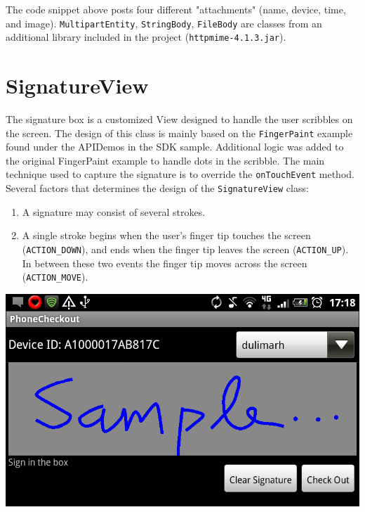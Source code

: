 \documentclass[11pt]{article} %
\begin{document}
The code snippet above posts four different "attachments" (name, device,
time, and image). \texttt{MultipartEntity}, \texttt{StringBody},
\texttt{FileBody} are classes from an additional library included
in the project (\texttt{httpmime-4.1.3.jar}).

\section{SignatureView}
The signature box is a customized View designed to handle the user scribbles 
on the screen. The design of this class is mainly based on the \texttt{FingerPaint}
example found under the APIDemos in the SDK sample. Additional logic was
added to the original FingerPaint example to handle dots in the scribble.
The main technique used to capture the signature is 
to override the \texttt{onTouchEvent} method. Several factors that determines
the design of the \texttt{SignatureView} class:
\begin{enumerate}
\item A signature may consist of several strokes.
\item A single stroke begins when the user's finger tip touches the screen
  (\verb+ACTION_DOWN+),
   and ends when the finger tip leaves the screen (\verb+ACTION_UP+).
   In between these two events the finger tip moves across the screen
   (\verb+ACTION_MOVE+).
\end{enumerate}

\begin{center}
\includegraphics[width=6in]{signature}
\end{center}
\end{document}
